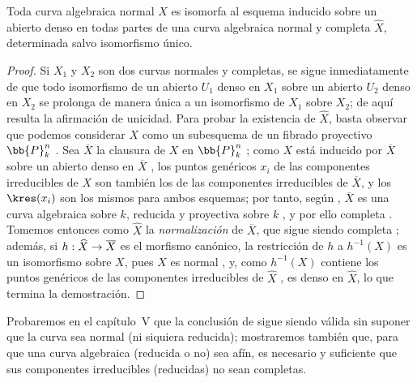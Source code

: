 \documentclass[oneside,10pt]{amsart}
\makeatletter
\newcommand{\ega@arrow}[2]{\mathchoice{#1}{#2}{#2}{#2}}
\renewcommand{\to}{\ega@arrow{\longrightarrow}{\rightarrow}}
\newcommand{\oldpage}[2][]{\marginnote{\normalfont\footnotesize\textbf{#1}~|~#2}\ignorespaces}
\let\EGAOriginalLabel\label
\renewcommand{\label}[1]{\phantomsection\EGAOriginalLabel{#1}}
\makeatother
\begin{document}
\begin{corollary}[7.4.11]
\label{II.7.4.11}
Toda curva algebraica normal $X$ es isomorfa al esquema inducido sobre un abierto denso en todas partes de una curva algebraica normal y completa $\widehat{X}$, determinada salvo isomorfismo único.
\end{corollary}

\begin{proof}
Si $X_1$ y $X_2$ son dos curvas normales y completas, se sigue inmediatamente de  que todo isomorfismo de un abierto $U_1$ denso en $X_1$ sobre un abierto $U_2$ denso en $X_2$ se prolonga de manera única a un isomorfismo de $X_1$ sobre $X_2$;
de aquí resulta la afirmación de unicidad.
Para probar la existencia de $\widehat{X}$, basta observar que podemos considerar $X$ como un subesquema de un fibrado proyectivo $\bb{P}_k^n$ .
Sea $\overline{X}$ la clausura de $X$ en $\bb{P}_k^n$ ;
como $X$ está inducido por $\overline{X}$ sobre un abierto denso en $\overline{X}$ , los puntos genéricos $x_i$ de las componentes irreducibles de $X$ son también los de las componentes irreducibles de $\overline{X}$, y los $\kres(x_i)$ son los mismos para ambos esquemas; por tanto, según , $\overline{X}$ es una curva algebraica sobre $k$, reducida  y proyectiva sobre $k$ , y por ello completa .
Tomemos entonces como $\widehat{X}$ la \emph{normalización} de $\overline{X}$, que sigue siendo completa ;
además, si $h:\widehat{X}\to\overline{X}$ es el morfismo canónico, la restricción de $h$ a $h^{-1}(X)$ es un isomorfismo sobre $X$, pues $X$ es normal , y, como $h^{-1}(X)$ contiene los puntos genéricos de las componentes irreducibles de $\widehat{X}$ , es denso en $\widehat{X}$, lo que termina la demostración.
\end{proof}

\oldpage[II]{151}
\begin{remark}[7.4.12]
\label{II.7.4.12}
Probaremos en el capítulo~V que la conclusión de  sigue siendo válida sin suponer que la curva sea normal (ni siquiera reducida);
mostraremos también que, para que una curva algebraica (reducida o no) sea afín, es necesario y suficiente que sus componentes irreducibles (reducidas) no sean completas.
\end{remark}
\end{document}
